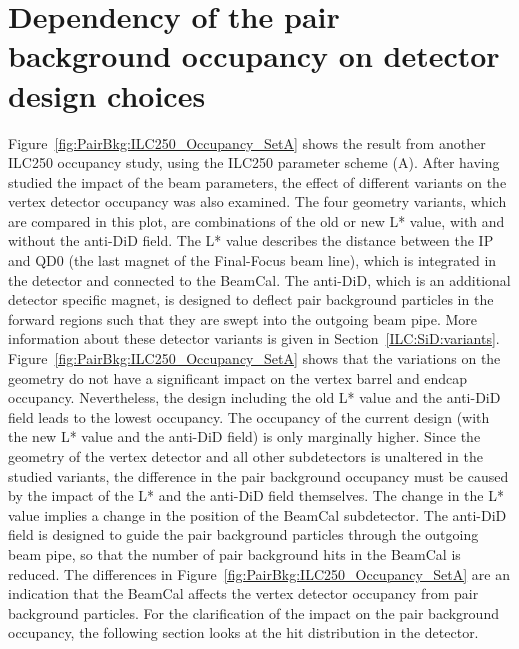 \section{Dependency of the pair background occupancy on detector design choices}
Figure~\ref{fig:PairBkg:ILC250_Occupancy_SetA} shows the result from another ILC250 occupancy study, using the ILC250 parameter scheme (A).
After having studied the impact of the beam parameters, the effect of different \sid variants on the vertex detector occupancy was also examined.
The four geometry variants, which are compared in this plot, are combinations of the old or new L* value, with and without the \sid anti-DiD field.
The L* value describes the distance between the IP and QD0 (the last magnet of the Final-Focus beam line), which is integrated in the detector and connected to the BeamCal.
The anti-DiD, which is an additional detector specific magnet, is designed to deflect pair background particles in the forward regions such that they are swept into the outgoing beam pipe.
More information about these detector variants is given in Section~\ref{ILC:SiD:variants}.
\\Figure~\ref{fig:PairBkg:ILC250_Occupancy_SetA} shows that the variations on the \sid geometry do not have a significant impact on the vertex barrel and endcap occupancy. 
Nevertheless, the \sid design including the old L* value and the anti-DiD field leads to the lowest occupancy.
The occupancy of the current design (with the new L* value and the anti-DiD field) is only marginally higher.
Since the geometry of the vertex detector and all other subdetectors is unaltered in the studied \sid variants, the difference in the pair background occupancy must be caused by the impact of the L* and the anti-DiD field themselves.
The change in the L* value implies a change in the position of the BeamCal subdetector.
The anti-DiD field is designed to guide the pair background particles through the outgoing beam pipe, so that the number of pair background hits in the BeamCal is reduced.
The differences in Figure~\ref{fig:PairBkg:ILC250_Occupancy_SetA} are an indication that the \sid BeamCal affects the vertex detector occupancy from pair background particles.
For the clarification of the impact on the pair background occupancy, the following section looks at the hit distribution in the \sid detector.
